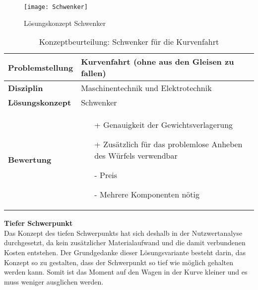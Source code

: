 \documentclass[../../main.tex]{subfiles}
\begin{document}
    \begin{figure}[H] %
        \centering
        \texttt{[image: Schwenker]}
        \caption{Lösungskonzept Schwenker}
        \label{fig:schwenker}
    \end{figure}

    \begin{flushleft}
        \begin{table}[h]
        \begin{tabular}{ | l | p{11cm} |}
        \hline
        \textbf{Problemstellung} & Kurvenfahrt (ohne aus den Gleisen zu fallen) \\ \hline
        \textbf{Disziplin} & Maschinentechnik und Elektrotechnik \\ \hline
        \textbf{Lösungskonzept} & Schwenker \\ \hline
        \textbf{Bewertung} &  \begin{itemize}
                                \item[+] Genauigkeit der Gewichtsverlagerung
                                \item[+] Zusätzlich für das problemlose Anheben des Würfels verwendbar
                                \item[-] Preis 
                                \item[-] Mehrere Komponenten nötig 
                              \end{itemize} \\ \hline
        \end{tabular}
        \caption{Konzeptbeurteilung: Schwenker für die Kurvenfahrt}
        \label{tab:schwenker}
    \end{table}
    \end{flushleft}

    \textbf{Tiefer Schwerpunkt}\\
    Das Konzept des tiefen Schwerpunkts hat sich deshalb in der Nutzwertanalyse durchgesetzt, da kein zusätzlicher Materialaufwand und die damit verbundenen Kosten entstehen. Der Grundgedanke dieser Lösungsvariante besteht darin, das Konzept so zu gestalten, dass der Schwerpunkt so tief wie möglich gehalten werden kann. Somit ist das Moment auf den Wagen in der Kurve kleiner und es muss weniger ausglichen werden.
\end{document}
